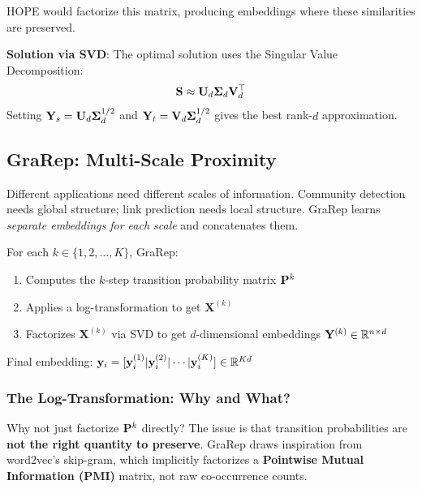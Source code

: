 \begin{notechapter}
\begin{example}
HOPE would factorize this matrix, producing embeddings where these similarities are preserved.
\end{example}

\textbf{Solution via SVD}: The optimal solution uses the Singular Value Decomposition:
\[
\mathbf{S} \approx \mathbf{U}_d \mathbf{\Sigma}_d \mathbf{V}_d^\top
\]
Setting $\mathbf{Y}_s = \mathbf{U}_d \mathbf{\Sigma}_d^{1/2}$ and $\mathbf{Y}_t = \mathbf{V}_d \mathbf{\Sigma}_d^{1/2}$ gives the best rank-$d$ approximation.

\subsection{GraRep: Multi-Scale Proximity}

\begin{whybox}
Different applications need different scales of information. Community detection needs global structure; link prediction needs local structure.
GraRep learns \emph{separate embeddings for each scale} and concatenates them.
\end{whybox}

\begin{definition}[GraRep]
For each $k \in \{1, 2, \ldots, K\}$, GraRep:
\begin{enumerate}
    \item Computes the $k$-step transition probability matrix $\mathbf{P}^k$
    \item Applies a log-transformation to get $\mathbf{X}^{(k)}$
    \item Factorizes $\mathbf{X}^{(k)}$ via SVD to get $d$-dimensional embeddings $\mathbf{Y}^{(k)} \in \mathbb{R}^{n \times d}$
\end{enumerate}
Final embedding: $\mathbf{y}_i = [\mathbf{y}_i^{(1)} | \mathbf{y}_i^{(2)} | \cdots | \mathbf{y}_i^{(K)}] \in \mathbb{R}^{Kd}$
\end{definition}

\subsubsection*{The Log-Transformation: Why and What?}

\begin{whybox}
Why not just factorize $\mathbf{P}^k$ directly? The issue is that transition probabilities are \textbf{not the right quantity to preserve}. GraRep draws inspiration from word2vec's skip-gram, which implicitly factorizes a \textbf{Pointwise Mutual Information (PMI)} matrix, not raw co-occurrence counts.
\end{whybox}


\end{notechapter}
